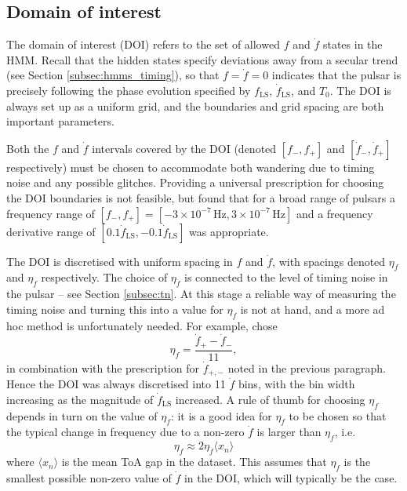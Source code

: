 \documentclass{article}
\begin{document}
\subsection{Domain of interest}
\label{subsec:doi}
The domain of interest (DOI) refers to the set of allowed $f$ and $\dot{f}$ states in the HMM.
Recall that the hidden states specify deviations away from a secular trend (see Section \ref{subsec:hmms_timing}), so that $f = \dot{f} = 0$ indicates that the pulsar is precisely following the phase evolution specified by $f_\text{LS}$, $\dot{f}_\text{LS}$, and $T_0$.
The DOI is always set up as a uniform grid, and the boundaries and grid spacing are both important parameters.

Both the $f$ and $\dot{f}$ intervals covered by the DOI (denoted $[f_-, f_+]$ and $[\dot{f}_-, \dot{f}_+]$ respectively) must be chosen to accommodate both wandering due to timing noise and any possible glitches.
Providing a universal prescription for choosing the DOI boundaries is not feasible, but \citet{DunnMelatos2022} found that for a broad range of pulsars a frequency range of $[f_-, f_+] = [-3 \times 10^{-7}\,\mathrm{Hz}, 3 \times 10^{-7}\,\mathrm{Hz}]$ and a frequency derivative range of $[0.1\dot{f}_\text{LS}, -0.1\dot{f}_\text{LS}]$ was appropriate.

The DOI is discretised with uniform spacing in $f$ and $\dot{f}$, with spacings denoted $\eta_f$ and $\eta_{\dot{f}}$ respectively.
The choice of $\eta_{\dot{f}}$ is connected to the level of timing noise in the pulsar -- see Section \ref{subsec:tn}.
At this stage a reliable way of measuring the timing noise and turning this into a value for $\eta_{\dot{f}}$ is not at hand, and a more ad hoc method is unfortunately needed.
For example, \citet{DunnMelatos2022} chose \begin{equation} \eta_{\dot{f}} = \frac{\dot{f}_+ - \dot{f}_-}{11}, \end{equation} in combination with the prescription for $\dot{f}_{+,-}$ noted in the previous paragraph. Hence the DOI was always discretised into 11 $\dot{f}$ bins, with the bin width increasing as the magnitude of $\dot{f}_\text{LS}$ increased.
A rule of thumb for choosing $\eta_f$ depends in turn on the value of $\eta_{\dot{f}}$: it is a good idea for $\eta_f$ to be chosen so that the typical change in frequency due to a non-zero $\dot{f}$ is larger than $\eta_f$, i.e. \begin{equation} \eta_f \approx 2\eta_{\dot{f}}\langle x_n \rangle \end{equation} where $\langle x_n \rangle$ is the mean ToA gap in the dataset.
This assumes that $\eta_{\dot{f}}$ is the smallest possible non-zero value of $\dot{f}$ in the DOI, which will typically be the case.
\end{document}
